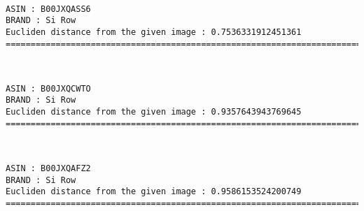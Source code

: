 \documentclass[11pt]{article}
\begin{document}
    \begin{center}
    \end{center}
    { \hspace*{\fill} \\}
    
    \begin{Verbatim}[commandchars=\\\{\}]
ASIN : B00JXQASS6
BRAND : Si Row
Eucliden distance from the given image : 0.7536331912451361
=============================================================================================================================

    \end{Verbatim}

    \begin{center}
    \end{center}
    { \hspace*{\fill} \\}
    
    \begin{Verbatim}[commandchars=\\\{\}]
ASIN : B00JXQCWTO
BRAND : Si Row
Eucliden distance from the given image : 0.9357643943769645
=============================================================================================================================

    \end{Verbatim}

    \begin{center}
    \end{center}
    { \hspace*{\fill} \\}
    
    \begin{Verbatim}[commandchars=\\\{\}]
ASIN : B00JXQAFZ2
BRAND : Si Row
Eucliden distance from the given image : 0.9586153524200749
=============================================================================================================================

    \end{Verbatim}

    \begin{center}
    \end{center}
    { \hspace*{\fill} \\}
    
\end{document}
